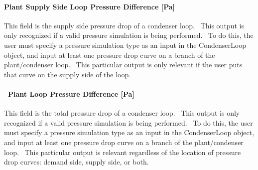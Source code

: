 \paragraph{Plant Supply Side Loop Pressure Difference {[}Pa{]}}\label{plant-supply-side-loop-pressure-difference-pa-1}

This field is the supply side pressure drop of a condenser loop.~ This output is only recognized if a valid pressure simulation is being performed.~ To do this, the user must specify a pressure simulation type as an input in the CondenserLoop object, and input at least one pressure drop curve on a branch of the plant/condenser loop.~ This particular output is only relevant if the user puts that curve on the supply side of the loop.

\paragraph{~Plant Loop Pressure Difference {[}Pa{]}}\label{plant-loop-pressure-difference-pa-1}

This field is the total pressure drop of a condenser loop.~ This output is only recognized if a valid pressure simulation is being performed.~ To do this, the user must specify a pressure simulation type as an input in the CondenserLoop object, and input at least one pressure drop curve on a branch of the plant/condenser loop.~ This particular output is relevant regardless of the location of pressure drop curves: demand side, supply side, or both.
